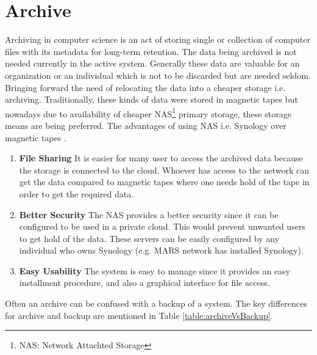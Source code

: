 \section{Archive}

Archiving in computer science is an act of storing single or collection of computer files with its metadata for long-term retention. The data being archived is 
not needed currently in the active system. Generally these data are valuable for an organization or an individual which is not to be discarded but are needed seldom. 
Bringing forward the need of relocating the data into a cheaper storage i.e. archiving. Traditionally, these kinds of data were stored in magnetic tapes but nowadays 
due to availability of cheaper NAS\footnote{NAS: Network Attachted Storage} primary storage, 
these storage means are being preferred. 
The advantages of using NAS i.e. Synology over magnetic tapes \cite{Synology}.
\begin{enumerate}
    \item \textbf{File Sharing} It is easier for many user to access the archived data because the storage is connected to the cloud. Whoever has access to the
    network can get the data compared to magnetic tapes where one needs hold of the tape in order to get the required data.
    \item \textbf{Better Security} The NAS provides a better security since it can be configured to be used in a private cloud. This would prevent unwanted users
    to get hold of the data. These servers can be easily configured by any individual who owns Synology (e.g. MARS network has installed Synology).
    \item \textbf{Easy Usability} The system is easy to manage since it provides an easy installment procedure, and also a graphical interface for file access.
\end{enumerate}
Often an archive can be confused
with a backup of a system. The key differences for archive and backup are mentioned in Table \ref{table:archiveVsBackup}.


